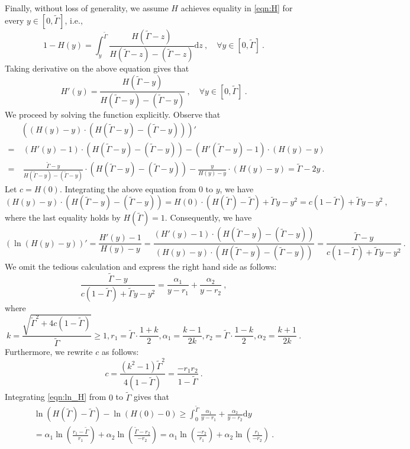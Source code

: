 \documentclass[11pt,letterpaper]{article}
\newcommand{\dd}[1]{\mathrm{d}#1}
\begin{document}
Finally, without loss of generality, we assume $H$ achieves equality in \eqref{eqn:H} for every $y \in [0,\tilde{\Gamma}]$, i.e., 
\[
1-H(y) = \int_y^{\tilde\Gamma} \frac{H(\tilde\Gamma-z)}{H(\tilde\Gamma-z)-(\tilde\Gamma-z)} \dd z~, \quad \forall y \in [0,\tilde{\Gamma}]~.
\]
Taking derivative on the above equation gives that
\begin{equation}
H'(y) = \frac{H(\tilde\Gamma- y)}{H(\tilde\Gamma - y) - (\tilde\Gamma - y)}~, \quad \forall y \in [0,\tilde\Gamma]~.
\label{eqn:H_equal}
\end{equation}
We proceed by solving the function explicitly. Observe that
\begin{align*}
& ((H(y)-y)\cdot (H(\tilde{\Gamma}-y)-(\tilde{\Gamma}-y)))' \\
= & \ (H'(y)-1)\cdot(H(\tilde{\Gamma}-y)-(\tilde{\Gamma}-y)) - (H'(\tilde{\Gamma}-y)-1)\cdot (H(y)-y) \\
= & \ \frac{\tilde{\Gamma}-y}{H(\tilde{\Gamma}-y)-(\tilde{\Gamma}-y)}\cdot(H(\tilde{\Gamma}-y)-(\tilde{\Gamma}-y)) - \frac{y}{H(y)-y} \cdot (H(y)-y) = \tilde{\Gamma} -2y~.
\end{align*}
Let $c=H(0)$. Integrating the above equation from $0$ to $y$, we have
\[
(H(y)-y)\cdot (H(\tilde{\Gamma}-y)-(\tilde{\Gamma}-y)) = H(0)\cdot (H(\tilde{\Gamma})-\tilde{\Gamma}) + \tilde{\Gamma} y - y^2 = c(1-\tilde{\Gamma})+\tilde{\Gamma} y-y^2~,
\]
where the last equality holds by $H(\tilde{\Gamma}) = 1$. Consequently, we have
\begin{equation}
(\ln(H(y)-y))' = \frac{H'(y)-1}{H(y)-y} = \frac{(H'(y)-1) \cdot (H(\tilde{\Gamma}-y)-(\tilde{\Gamma} - y))}{(H(y)-y) \cdot (H(\tilde{\Gamma}-y)-(\tilde{\Gamma}-y))} =\frac{\tilde{\Gamma}-y}{c(1-\tilde{\Gamma}) + \tilde{\Gamma} y - y^2}~.
\label{eqn:ln_H}
\end{equation}
We omit the tedious calculation and express the right hand side as follows:
\[
\frac{\tilde{\Gamma}-y}{c(1-\tilde{\Gamma}) + \tilde{\Gamma} y - y^2} = \frac{\alpha_1}{y-r_1} + \frac{\alpha_2}{y-r_2}~,
\]
where 
\[
k=\frac{\sqrt{\tilde{\Gamma}^2+4c(1-\tilde{\Gamma})}}{\tilde{\Gamma}} \ge 1, 
r_{1}=\tilde{\Gamma} \cdot \frac{1 + k}{2}, \alpha_{1}=\frac{k -1}{2k}, r_{2}=\tilde{\Gamma} \cdot \frac{1 - k}{2}, \alpha_{2}=\frac{k+1}{2k}~.
\]
Furthermore, we rewrite $c$ as follows:
\[
c=\frac{(k^2-1)\tilde{\Gamma}^2}{4(1-\tilde{\Gamma})}=\frac{-r_1r_2}{1-\tilde{\Gamma}}~.
\]
Integrating \eqref{eqn:ln_H} from $0$ to $\tilde\Gamma$ gives that
\begin{multline*}
\ln(H(\tilde\Gamma)-\tilde\Gamma)-\ln(H(0)-0) \ge \int_0^{\tilde\Gamma} \frac{\alpha_1}{y-r_1}  + \frac{\alpha_2}{y-r_2} \dd y \\
= \alpha_1\ln \left(\frac{r_1-\tilde\Gamma}{r_1}\right) +\alpha_2 \ln\left(\frac{\tilde\Gamma-r_2}{-r_2}\right) = \alpha_1 \ln \left( \frac{-r_2}{r_1} \right) + \alpha_2 \ln \left( \frac{r_1}{-r_2} \right)~.
\end{multline*}
\end{document}
